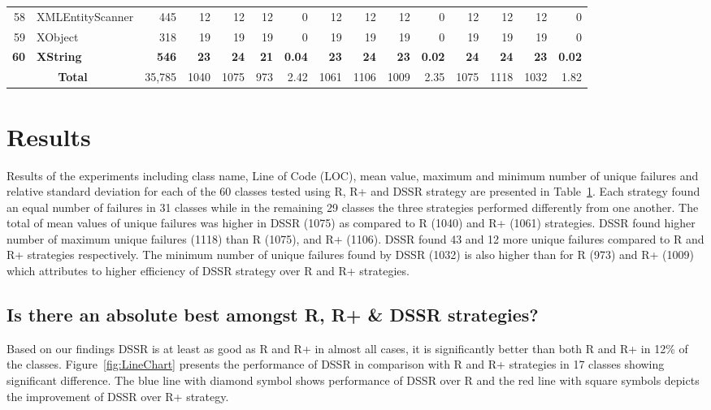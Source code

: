 \begin{table} [htp!]
{\begin{tabularx}{1 \textwidth}{r l r r r r r r r r r r r r r}
58						& XMLEntityScanner			&445		& 12		&	12	&	12	& 	0					& 12		&  12		& 12		& 		0			& 12			& 12			& 12			&	0\\      
59						& XObject					&318		& 19		&	19	&	19	& 	0					& 19		&  19		& 19		& 		0			& 19			& 19			& 19			&	0\\      
\textbf{60}						& \textbf{XString}					&\textbf{546}		& \textbf{23}		&	\textbf{24}	&	\textbf{21}	& 	\textbf{0.04}					& \textbf{23}		&  \textbf{24}		& \textbf{23}		& 		\textbf{0.02}			& \textbf{24}			& \textbf{24}			& \textbf{23}			&	\textbf{0.02}\\      

    						\multicolumn{2}{c}{\textbf{Total}}	&35,785	&1040	&	1075	&    973	&	2.42				& 1061	&1106	&1009	&		2.35		& 1075		& 1118		& 1032		& 	1.82\\
     \end{tabularx} }
    \bigskip
    \label{table:Results}
\end{table}

\section{Results}\label{sec:res}
Results of the experiments including class name, Line of Code (LOC), mean value, maximum and minimum number of unique failures and relative standard deviation for each of the 60 classes tested using R, R+ and DSSR strategy are presented in Table~\ref{table:Results}. Each strategy found an equal number of failures in 31 classes while in the remaining 29 classes the three strategies performed differently from one another. The total of mean values of unique failures was higher in DSSR (1075) as compared to R (1040) and R+ (1061) strategies. 
DSSR found higher number of maximum unique failures (1118) than R (1075), and R+ (1106). DSSR found 43 and 12 more unique failures compared to R and R+ strategies respectively. The minimum number of unique failures found by DSSR (1032) is also higher than for R (973) and R+ (1009) which attributes to higher efficiency of DSSR strategy over R and R+ strategies. 


\subsection{Is there an absolute best amongst R, R+ \& DSSR strategies?}
Based on our findings DSSR is at least as good as R and R+ in almost all cases, it is significantly better than both R and R+ in 12\% of the classes. Figure~\ref{fig:LineChart} presents the performance of DSSR in comparison with R and R+ strategies in 17 classes showing significant difference. The blue line with diamond symbol shows performance of DSSR over R and the red line with square symbols depicts the improvement of DSSR over R+ strategy. 

